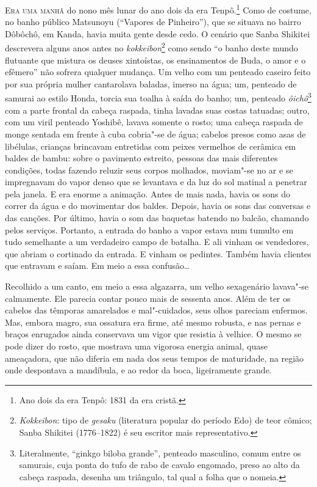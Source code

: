 \sectionitem
\noindent\textsc{Era uma manhã} do nono mês lunar do ano dois da 
era Tenpô.\footnote{ Ano dois da era Tenpô: 1831 da era cristã.} Como de costume, no banho
público Matsunoyu (``Vapores de Pinheiro''), que se situava no bairro
Dôbôchô, em Kanda, havia muita gente desde cedo. O cenário que Sanba Shikitei   
descrevera alguns anos antes no \textit{kokkeibon}\footnote{ \textit{Kokkeibon}: 
tipo de \textit{gesaku} (literatura popular do período Edo) de teor cômico; Sanba Shikitei (1776--1822) é
seu escritor mais representativo.} como sendo ``o banho deste
mundo flutuante que mistura os deuses xintoístas, os ensinamentos de
Buda, o amor e o efêmero'' não sofrera qualquer mudança. Um velho com um
penteado caseiro feito por sua própria mulher cantarolava baladas,
imerso na água; um, penteado de samurai ao estilo Honda, torcia sua
toalha à saída do banho; um, penteado \textit{ôichô}\footnote{ Literalmente, 
``ginkgo biloba grande'', penteado masculino, comum entre 
os samurais, cuja ponta do tufo de rabo de cavalo engomado, preso ao alto da cabeça raspada, 
desenha um triângulo, tal qual a folha que o nomeia.} com a
parte frontal da cabeça raspada, tinha lavadas suas costas tatuadas; outro, 
com um viril penteado Yoshibê, lavava somente o rosto; uma cabeça raspada de
monge sentada em frente à cuba cobria"-se de água; cabelos presos como
asas de libélulas, crianças brincavam entretidas com peixes vermelhos
de cerâmica em baldes de bambu: sobre o pavimento estreito, pessoas das
mais diferentes condições, todas fazendo reluzir seus corpos molhados,
moviam"-se no ar e se impregnavam do vapor denso que se levantava e da
luz do sol matinal a penetrar pela janela. E era enorme a animação.
Antes de mais nada, havia os sons do correr da água e do movimentar dos
baldes. Depois, havia os sons das conversas e das canções. Por último,
havia o som das baquetas batendo no balcão, chamando pelos serviços.
Portanto, a entrada do banho a vapor estava num tumulto em tudo 
semelhante a um verdadeiro campo de batalha. E ali vinham os vendedores, que
abriam o cortinado da entrada. E vinham os pedintes. Também havia
clientes que entravam e saíam. Em meio a essa confusão\ldots{}

Recolhido a um canto, em meio a essa algazarra, um velho sexagenário
lavava"-se calmamente. Ele parecia contar pouco mais de sessenta anos.
Além de ter os cabelos das têmporas amarelados e mal"-cuidados, seus
olhos pareciam enfermos. Mas, embora magro, sua ossatura era firme, até
mesmo robusta, e nas pernas e braços enrugados ainda conservava um
vigor que resistia à velhice. O mesmo se pode dizer do rosto, que
mostrava uma vigorosa energia animal, quase ameaçadora, que não diferia
em nada dos seus tempos de maturidade, na região onde despontava a mandíbula, 
e ao redor da boca, ligeiramente grande.

